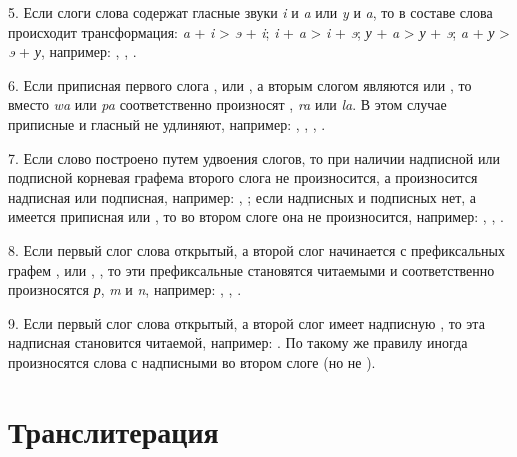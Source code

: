 5.	Если слоги слова содержат гласные звуки \textit{i} и \textit{a} или \textit{y} и \textit{a}, то в составе слова происходит трансформация: \textit{a} + \textit{i} > \textit{{\unifont ɘ}} + \textit{i}; \textit{i} + \textit{a} > \textit{i} + \textit{{\unifont ɘ}}; \textit{у} + \textit{a} > \textit{у} + \textit{{\unifont ɘ}}; \textit{a} + \textit{у} > \textit{{\unifont ɘ}} + \textit{у}, например: , , .

6. Если приписная первого слога ,  или , а вторым слогом являются  или , то вместо \textit{wa} или \textit{pa} соответственно произносят \textrtailn{}, \textit{ra} или \textit{la}. В этом случае приписные  и гласный не удлиняют, например:
,
,
,
.

7.	Если слово построено путем удвоения слогов, то при наличии надписной или подписной корневая графема второго слога не произносится, а произносится надписная или подписная, например:
, 
;
если надписных и подписных нет, а имеется приписная  или , то во втором слоге она не произносится, например:
,
,
.

8. Если первый слог слова открытый, а второй слог начинается с префиксальных графем ,  или , , то эти префиксальные становятся читаемыми и соответственно произносятся \textit{р}, \textit{m} и \textit{n}, например:
,
,
.

9. Если первый слог слова открытый, а второй слог имеет надписную , то эта надписная становится читаемой, например: . По такому же правилу иногда произносятся слова с надписными  во втором слоге (но не ).

\section{Транслитерация}

